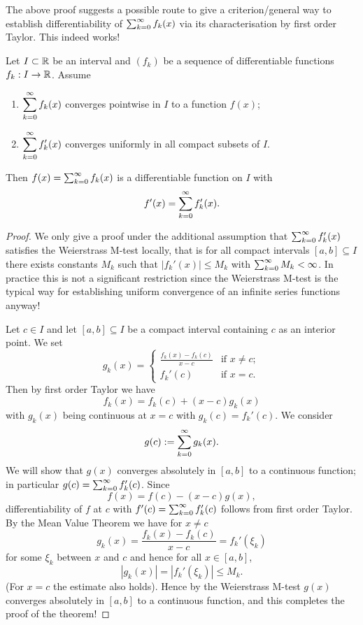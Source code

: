 \documentclass[10pt, a4paper]{article}
\newcommand{\infsumo}{\infsum[k = 0]}
\begin{document}
The above proof suggests a possible route to give a criterion/general way to establish differentiability of $\infsumo f_k(x)$ via its characterisation by first order Taylor.
This indeed works!

\begin{theorem}\label{pre:analy:thm:convserofseqdifffuncs}
    Let $I \subset \mathbb{R}$ be an interval and $(f_k)$ be a sequence of differentiable functions $f_k : I \rightarrow \mathbb{R}$.
    Assume
    \begin{enumerate}[label = (\roman*)]
        \item $\displaystyle\infsumo f_k(x)$ converges pointwise in $I$ to a function $f(x)$;
        \item $\displaystyle\infsumo f_k'(x)$ converges uniformly in all compact subsets of $I$.
    \end{enumerate}
    Then $f(x) = \infsumo f_k(x)$ is a differentiable function on $I$ with
    \[
    f'(x) = \infsumo f_k'(x).
    \]
    \begin{proof}
        We only give a proof under the additional assumption that $\infsumo f_k'(x)$ satisfies the Weierstrass M-test locally,
        that is for all compact intervals $[a, b] \subseteq I$ there exists constants $M_k$ such that $|f_k'(x)| \leq M_k$ with $\infsumo M_k < \infty$.
        In practice this is not a significant restriction since the Weierstrass M-test is the typical way for establishing uniform convergence of an infinite series functions anyway!

        Let $c \in I$ and let $[a, b] \subseteq I$ be a compact interval containing $c$ as an interior point.
        We set
        \[
        g_k(x) = \begin{cases}
            \frac{f_k(x) - f_k(c)}{x - c} & \text{if } x \neq c; \\
            f_k'(c) & \text{if } x = c.
        \end{cases}
        \]
        Then by first order Taylor we have
        \[
        f_k(x) = f_k(c) + (x - c)g_k(x)
        \]
        with $g_k(x)$ being continuous at $x = c$ with $g_k(c) = f_k'(c)$.
        We consider
        \[
        g(c) := \infsumo g_k(x).
        \]
        We will show that $g(x)$ converges absolutely in $[a, b]$ to a continuous function;
        in particular $g(c) = \infsumo f_k'(c)$.
        Since
        \[
        f(x) = f(c) - (x - c)g(x),
        \]
        differentiability of $f$ at $c$ with $f'(c) = \infsumo f_k'(c)$ follows from first order Taylor.
        By the Mean Value Theorem we have for $x \neq c$
        \[
        g_k(x) = \frac{f_k(x) - f_k(c)}{x - c} = f_k'(\xi_k)
        \]
        for some $\xi_k$ between $x$ and $c$ and hence for all $x \in [a, b]$,
        \[
        |g_k(x)| = |f_k'(\xi_k)| \leq M_k.
        \]
        (For $x = c$ the estimate also holds).
        Hence by the Weierstrass M-test $g(x)$ converges absolutely in $[a, b]$ to a continuous function,
        and this completes the proof of the theorem!
    \end{proof}
\end{theorem}
\end{document}
